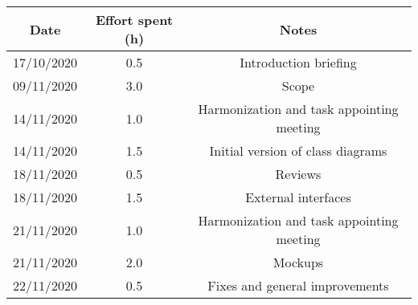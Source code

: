 \documentclass[../../main.tex]{subfiles}
\begin{document}
\begin{center}
    \begin{tabular}{|c| |c| |c|} 
        \hline
        Date & Effort spent (h) & Notes\\ [0.5ex] 
        \hline\hline
        17/10/2020 & 0.5 & Introduction briefing\\ 
        09/11/2020 & 3.0 & Scope\\ 
        14/11/2020 & 1.0 & Harmonization and task appointing meeting\\
        14/11/2020 & 1.5 & Initial version of class diagrams\\
        18/11/2020 & 0.5 & Reviews\\
        18/11/2020 & 1.5 & External interfaces\\
        21/11/2020 & 1.0 & Harmonization and task appointing meeting\\
        21/11/2020 & 2.0 & Mockups\\
        22/11/2020 & 0.5 & Fixes and general improvements\\
        \hline
    \end{tabular}
\end{center}
\end{document}
